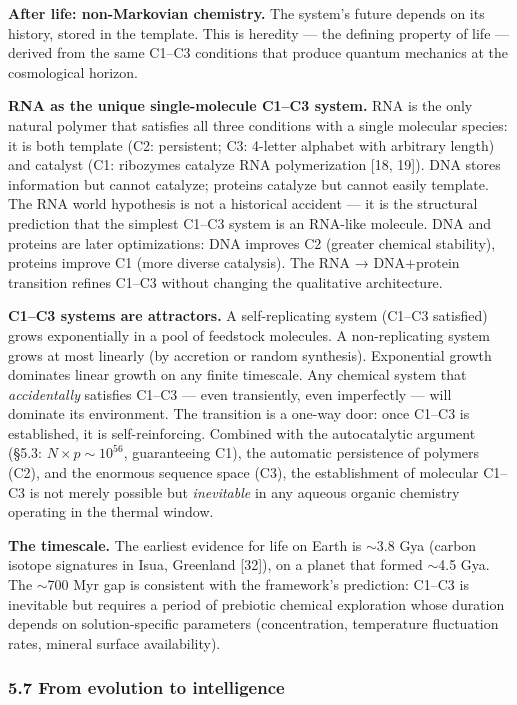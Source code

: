 \documentclass[
]{article}
\begin{document}
\textbf{After life: non-Markovian chemistry.} The system's future
depends on its history, stored in the template. This is heredity --- the
defining property of life --- derived from the same C1--C3 conditions
that produce quantum mechanics at the cosmological horizon.

\textbf{RNA as the unique single-molecule C1--C3 system.} RNA is the
only natural polymer that satisfies all three conditions with a single
molecular species: it is both template (C2: persistent; C3: 4-letter
alphabet with arbitrary length) and catalyst (C1: ribozymes catalyze RNA
polymerization {[}18, 19{]}). DNA stores information but cannot
catalyze; proteins catalyze but cannot easily template. The RNA world
hypothesis is not a historical accident --- it is the structural
prediction that the simplest C1--C3 system is an RNA-like molecule. DNA
and proteins are later optimizations: DNA improves C2 (greater chemical
stability), proteins improve C1 (more diverse catalysis). The RNA →
DNA+protein transition refines C1--C3 without changing the qualitative
architecture.

\textbf{C1--C3 systems are attractors.} A self-replicating system
(C1--C3 satisfied) grows exponentially in a pool of feedstock molecules.
A non-replicating system grows at most linearly (by accretion or random
synthesis). Exponential growth dominates linear growth on any finite
timescale. Any chemical system that \emph{accidentally} satisfies C1--C3
--- even transiently, even imperfectly --- will dominate its
environment. The transition is a one-way door: once C1--C3 is
established, it is self-reinforcing. Combined with the autocatalytic
argument (§5.3: \(N \times p \sim 10^{56}\), guaranteeing C1), the
automatic persistence of polymers (C2), and the enormous sequence space
(C3), the establishment of molecular C1--C3 is not merely possible but
\emph{inevitable} in any aqueous organic chemistry operating in the
thermal window.

\textbf{The timescale.} The earliest evidence for life on Earth is
$\sim$3.8 Gya (carbon isotope signatures in Isua, Greenland {[}32{]}),
on a planet that formed $\sim$4.5 Gya. The $\sim$700 Myr gap is
consistent with the framework's prediction: C1--C3 is inevitable but
requires a period of prebiotic chemical exploration whose duration
depends on solution-specific parameters (concentration, temperature
fluctuation rates, mineral surface availability).

\hypertarget{from-evolution-to-intelligence}{%
\subsubsection{5.7 From evolution to
intelligence}\label{from-evolution-to-intelligence}}
\end{document}

